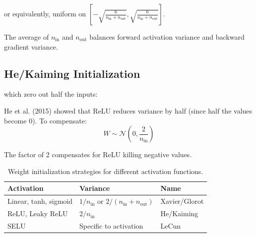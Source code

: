 or equivalently, uniform on $\left[-\sqrt{\frac{6}{n_{\text{in}}+n_{\text{out}}}}, \sqrt{\frac{6}{n_{\text{in}}+n_{\text{out}}}}\right]$.

The average of $n_{\text{in}}$ and $n_{\text{out}}$ balances forward activation variance and backward gradient variance.


\subsection{He/Kaiming Initialization}

 which zero out half the inputs:

He et al. (2015) showed that ReLU reduces variance by half (since half the values become 0). To compensate:
\begin{equation}
    W \sim \mathcal{N}\left(0, \frac{2}{n_{\text{in}}}\right)
\end{equation}

The factor of 2 compensates for ReLU killing negative values.

\vspace{2em}
\begin{table}[ht]
\centering
\begin{tabular}{p{}p{}p{}}
\toprule
\textbf{Activation} & \textbf{Variance} & \textbf{Name} \\
\midrule
Linear, tanh, sigmoid & $1/n_{\text{in}}$ or $2/(n_{\text{in}} + n_{\text{out}})$ & Xavier/Glorot \\
ReLU, Leaky ReLU & $2/n_{\text{in}}$ & He/Kaiming \\
SELU & Specific to activation & LeCun \\
\bottomrule
\end{tabular}
\vspace{2em}
\caption{Weight initialization strategies for different activation functions.}
\label{tab:weight_init}
\end{table}


